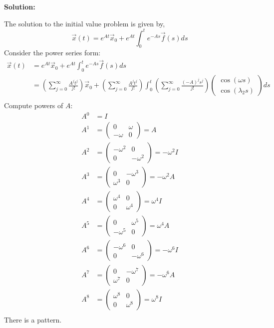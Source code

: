 \documentclass[12pt]{article}
\newenvironment{solution}{
    \textbf{Solution:}
    
}{
    
    \vspace{2em}
}
\begin{document}
\begin{solution}
    The solution to the initial value problem is given by,
    \[
        \vec{x}(t) = e^{At}\vec{x}_0 + e^{At} \int_0^t e^{-As} \vec{f}(s) ds
    \]
    Consider the power series form:
    \[
        \begin{aligned}
            \vec{x}(t) &= e^{At}\vec{x}_0 + e^{At} \int_0^t e^{-As} \vec{f}(s) ds\\
            &= \left(\sum_{j=0}^{\infty} \frac{A^j t^j}{j!}\right) \vec{x}_0 + \left(\sum_{j=0}^{\infty} \frac{A^j t^j}{j!}\right) \int_0^t \left(\sum_{j=0}^{\infty} \frac{(-A)^j s^j}{j!}\right) \begin{pmatrix} \cos(\omega s) \\ \cos(\lambda_2 s) \end{pmatrix} ds\\
        \end{aligned}
    \]
    Compute powers of \(A\):
    \[
        \begin{aligned}
            A^0 &= I\\
            A^1 &= \begin{pmatrix} 0 & \omega \\ -\omega & 0 \end{pmatrix} = A\\
            A^2 &= \begin{pmatrix} -\omega^2 & 0 \\ 0 & -\omega^2 \end{pmatrix} = -\omega^2 I\\
            A^3 &= \begin{pmatrix} 0 & -\omega^3 \\ \omega^3 & 0 \end{pmatrix} = -\omega^2 A\\
            A^4 &= \begin{pmatrix} \omega^4 & 0 \\ 0 & \omega^4 \end{pmatrix} = \omega^4 I\\
            A^5 &= \begin{pmatrix} 0 & \omega^5 \\ -\omega^5 & 0 \end{pmatrix} = \omega^4 A\\
            A^6 &= \begin{pmatrix} -\omega^6 & 0 \\ 0 & -\omega^6 \end{pmatrix} = -\omega^6 I\\
            A^7 &= \begin{pmatrix} 0 & -\omega^7 \\ \omega^7 & 0 \end{pmatrix} = -\omega^6 A\\
            A^8 &= \begin{pmatrix} \omega^8 & 0 \\ 0 & \omega^8 \end{pmatrix} = \omega^8 I\\
        \end{aligned}
    \]
    There is a pattern.


\end{solution}
\end{document}
